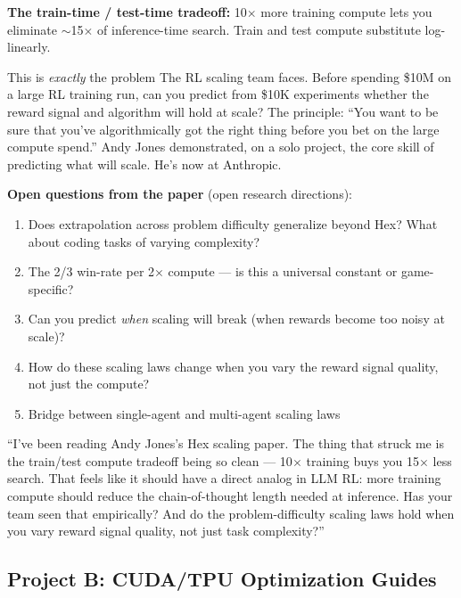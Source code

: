\textbf{The train-time / test-time tradeoff:} 10$\times$ more training compute lets you eliminate $\sim$15$\times$ of inference-time search. Train and test compute substitute log-linearly.

\begin{whyanthro}
This is \textit{exactly} the problem The RL scaling team faces. Before spending \$10M on a large RL training run, can you predict from \$10K experiments whether the reward signal and algorithm will hold at scale? The principle: ``You want to be sure that you've algorithmically got the right thing before you bet on the large compute spend.'' Andy Jones demonstrated, on a solo project, the core skill of predicting what will scale. He's now at Anthropic.
\end{whyanthro}

\textbf{Open questions from the paper} (open research directions):
\begin{enumerate}
  \item Does extrapolation across problem difficulty generalize beyond Hex? What about coding tasks of varying complexity?
  \item The 2/3 win-rate per 2$\times$ compute --- is this a universal constant or game-specific?
  \item Can you predict \textit{when} scaling will break (when rewards become too noisy at scale)?
  \item How do these scaling laws change when you vary the reward signal quality, not just the compute?
  \item Bridge between single-agent and multi-agent scaling laws
\end{enumerate}

\begin{sayit}
``I've been reading Andy Jones's Hex scaling paper. The thing that struck me is the train/test compute tradeoff being so clean --- 10$\times$ training buys you 15$\times$ less search. That feels like it should have a direct analog in LLM RL: more training compute should reduce the chain-of-thought length needed at inference. Has your team seen that empirically? And do the problem-difficulty scaling laws hold when you vary reward signal quality, not just task complexity?''
\end{sayit}

\subsection{Project B: CUDA/TPU Optimization Guides}


